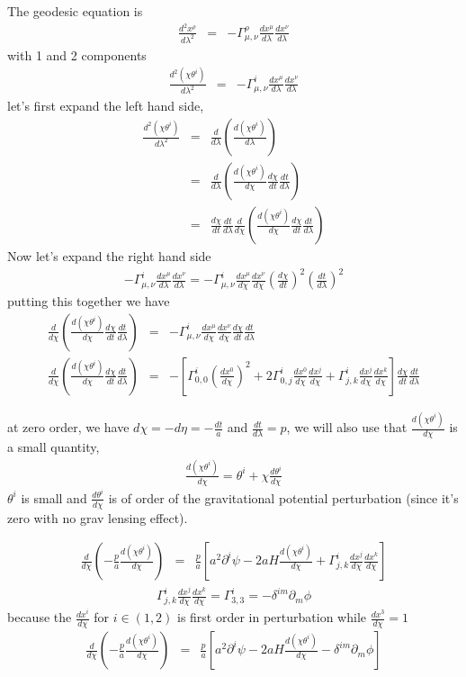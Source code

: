 \documentclass[a4paper, 11pt]{article}
\def\ba{\begin{eqnarray}}
\def\ea{\end{eqnarray}}
\begin{document}
The geodesic equation is 
\ba
\frac{d^{2} x^{\rho}}{d\lambda^{2}} &=& -\Gamma^{\rho}_{\mu, \nu} \frac{dx^{\mu}}{d\lambda} \frac{dx^{\nu}}{d\lambda} 
\ea
with 1 and 2 components
\ba
\frac{d^{2}(\chi \theta^{i}) }{d\lambda^{2}} &=& -\Gamma^{i}_{\mu, \nu} \frac{dx^{\mu}}{d\lambda} \frac{dx^{\nu}}{d\lambda} 
\ea
let's first expand the left hand side, 
\ba
\frac{d^{2}(\chi \theta^{i}) }{d\lambda^{2}} &=& \frac{d}{d\lambda} \left(\frac{d(\chi \theta^{i}) }{d\lambda}\right) \\
&=& \frac{d}{d\lambda} \left(\frac{d(\chi \theta^{i}) }{d\chi}\frac{d\chi}{dt} \frac{dt}{d\lambda} \right)  \\
&= & \frac{d\chi}{dt} \frac{dt}{d\lambda} \frac{d}{d\chi} \left(\frac{d(\chi \theta^{i}) }{d\chi}\frac{d\chi}{dt} \frac{dt}{d\lambda} \right)
\ea
Now let's expand the right hand side
\ba
 -\Gamma^{i}_{\mu, \nu} \frac{dx^{\mu}}{d\lambda} \frac{dx^{\nu}}{d\lambda} = -\Gamma^{i}_{\mu, \nu} \frac{dx^{\mu}}{d\chi} \frac{dx^{\nu}}{d\chi}  \left(\frac{d\chi}{dt}\right)^{2} \left(\frac{dt}{d\lambda} \right)^{2}
\ea
putting this together we have
\ba
\frac{d}{d\chi} \left(\frac{d(\chi \theta^{i}) }{d\chi}\frac{d\chi}{dt} \frac{dt}{d\lambda} \right) &=& -\Gamma^{i}_{\mu, \nu} \frac{dx^{\mu}}{d\chi} \frac{dx^{\nu}}{d\chi}  \frac{d\chi}{dt} \frac{dt}{d\lambda} \\
\frac{d}{d\chi} \left(\frac{d(\chi \theta^{i}) }{d\chi}\frac{d\chi}{dt} \frac{dt}{d\lambda} \right) &=& - \left[\Gamma^{i}_{0,0} \left(\frac{dx^{0}}{d\chi}\right)^{2} + 2 \Gamma^{i}_{0,j} \frac{dx^{0}}{d\chi}\frac{dx^{j}}{d\chi}  + \Gamma^{i}_{j,k}\frac{dx^{j}}{d\chi} \frac{dx^{k}}{d\chi}   \right]  \frac{d\chi}{dt} \frac{dt}{d\lambda} 
\ea

at zero order, we have $ d\chi = -d\eta = - \frac{dt}{a}$ and $\frac{dt}{d\lambda} = p$, we will also use that $\frac{d(\chi \theta^{i}) }{d\chi}$ is a small quantity, 
\ba
\frac{d(\chi \theta^{i}) }{d\chi} = \theta^{i} + \chi \frac{d \theta^{i} }{d\chi}
\ea
$\theta^{i}$ is small and $\frac{d \theta^{i} }{d\chi}$ is of order of the gravitational potential perturbation (since it's zero with no grav lensing effect).

\ba
\frac{d}{d\chi} \left( -\frac{p}{a}\frac{d(\chi \theta^{i}) }{d\chi} \right) &=& \frac{p}{a} \left[ a^{2}  \partial^{i} \psi - 2 a H \frac{d(\chi \theta^{i}) }{d\chi}  + \Gamma^{i}_{j,k}\frac{dx^{j}}{d\chi} \frac{dx^{k}}{d\chi}   \right] 
\ea
\ba
\Gamma^{i}_{j,k}\frac{dx^{j}}{d\chi} \frac{dx^{k}}{d\chi} = \Gamma^{i}_{3,3} =  -\delta^{im}\partial_{m} \phi
\ea
because the $\frac{dx^{i}}{d\chi}$ for $i \in (1,2)$ is first order in perturbation while $\frac{dx^{3}}{d\chi} = 1$
\ba
\frac{d}{d\chi} \left( -\frac{p}{a}\frac{d(\chi \theta^{i}) }{d\chi} \right) &=& \frac{p}{a} \left[ a^{2}  \partial^{i} \psi - 2 a H \frac{d(\chi \theta^{i}) }{d\chi}   -\delta^{im}\partial_{m} \phi  \right] 
\ea
\end{document}
